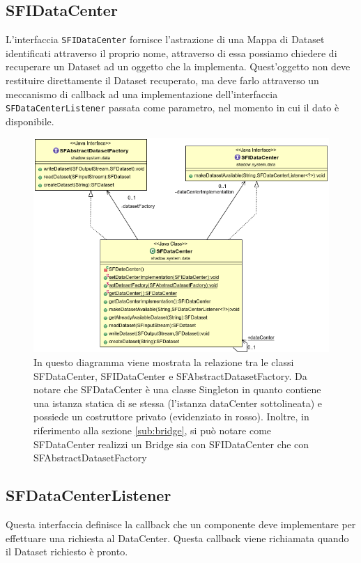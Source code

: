 \subsection{SFIDataCenter}
\label{sub:sfidatacenter}
L'interfaccia \texttt{SFIDataCenter} fornisce l'astrazione di una Mappa di Dataset identificati attraverso il proprio nome, attraverso di essa possiamo chiedere di recuperare un Dataset ad un oggetto che la implementa.
Quest'oggetto non deve restituire direttamente il Dataset recuperato, ma deve farlo attraverso un meccanismo di callback ad una implementazione dell'interfaccia \texttt{SFDataCenterListener} passata come parametro, nel momento in cui il dato \`e disponibile.

\begin{figure}
\begin{center}
\includegraphics[width=\textwidth]{Immagini/DataCenterBridge}
\caption[Diagramma delle classi di SFDataCenter,SFIDataCenter e SFAbstractDatasetFactory]{In questo diagramma viene mostrata la relazione tra le classi SFDataCenter, SFIDataCenter e SFAbstractDatasetFactory. Da notare che SFDataCenter \`e una classe Singleton in quanto contiene una istanza statica di se stessa (l'istanza dataCenter sottolineata) e possiede un costruttore privato (evidenziato in rosso). Inoltre, in riferimento alla sezione \ref{sub:bridge}, si pu\`o notare come SFDataCenter realizzi un Bridge sia con SFIDataCenter che con SFAbstractDatasetFactory \label{f:datacenterbridge}} 
\end{center} 
\end{figure}

\subsection{SFDataCenterListener}
\label{sub:sfdatacenterlistener}
Questa interfaccia definisce la callback che un componente deve implementare per effettuare una richiesta al DataCenter.
Questa callback viene richiamata quando il Dataset richiesto \`e pronto.

